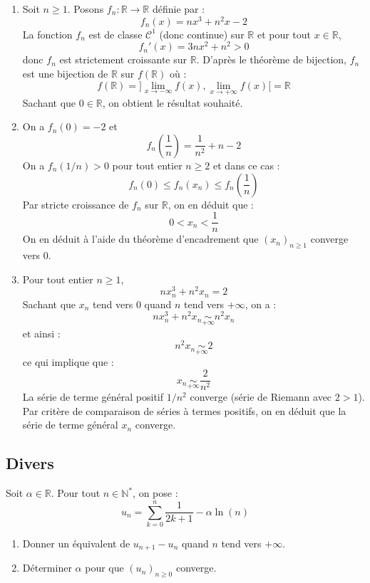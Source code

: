 \documentclass[a4paper,twoside,french,10pt]{VcCours}
\begin{document}
\begin{enumerate}
\item Soit $n \geq 1$. Posons $f_n : \mathbb{R} \rightarrow \mathbb{R}$ définie par :
$$ f_n(x) = nx^3+n^2x-2$$
La fonction $f_n$ est de classe $\mathcal{C}^1$ (donc continue) sur $\mathbb{R}$ et pour tout $x \in \mathbb{R}$,
$$ f_n'(x) = 3nx^2 + n^2 >0$$
donc $f_n$ est strictement croissante sur $\mathbb{R}$. D'après le théorème de bijection, $f_n$ est une bijection de $\mathbb{R}$ sur $f(\mathbb{R})$ où :
$$ f(\mathbb{R}) =  ]\lim_{x \rightarrow - \infty} f(x), \lim_{x \rightarrow +\infty} f(x)[= \mathbb{R}$$
Sachant que $0 \in \mathbb{R}$, on obtient le résultat souhaité.
\item On a $f_n(0)=-2$ et 
$$ f_n \left( \dfrac{1}{n} \right) = \dfrac{1}{n^2} + n -2$$
On a $f_n(1/n)>0$ pour tout entier $n \geq 2$ et dans ce cas :
$$ f_n(0) \leq f_n(x_n) \leq f_n \left( \dfrac{1}{n} \right) $$
Par stricte croissance de $f_n$ sur $\mathbb{R}$, on en déduit que :
$$ 0 < x_n < \dfrac{1}{n}$$
On en déduit à l'aide du théorème d'encadrement que $(x_n)_{n \geq 1}$ converge vers $0$.
\item Pour tout entier $n \geq 1$,
$$ nx_n^3+n^2x_n=2$$
Sachant que $x_n$ tend vers $0$ quand $n$ tend vers $+ \infty$, on a :
$$ nx_n^3+n^2x_n \underset{+ \infty}{\sim} n^2 x_n$$
et ainsi :
$$ 
n^2 x_n \underset{+ \infty}{\sim} 2$$
ce qui implique que :
$$ x_n \underset{+ \infty}{\sim}  \dfrac{2}{n^2}$$
La série de terme général positif $1/n^2$ converge (série de Riemann avec $2>1$). Par critère de comparaison de séries à termes positifs, on en déduit que la série de terme général $x_n$ converge.
\end{enumerate}

\medskip


\subsection{Divers}

\medskip

\begin{Exercice}{} Soit $\alpha \in \mathbb{R}$. Pour tout $n \in \mathbb{N}^*$, on pose :
$$ u_n = \sum_{k=0}^n \frac{1}{2k+1} -  \alpha \ln(n)$$

\begin{enumerate}
\item Donner un équivalent de $u_{n+1}-u_n$ quand $n$ tend vers $+ \infty$.
\item Déterminer $\alpha$ pour que $(u_n)_{n \geq 0}$ converge.
\end{enumerate}
\end{Exercice} 
\end{document}
